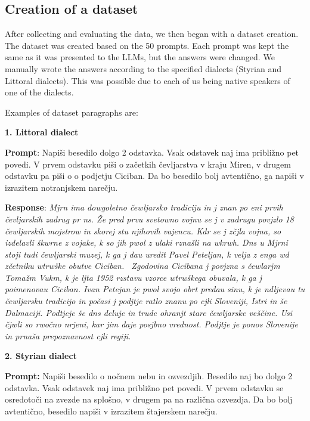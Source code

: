 \documentclass[fleqn,moreauthors,10pt]{ds_report}
\begin{document}
\subsection{Creation of a dataset}

After collecting and evaluating the data, we then began with a dataset creation. The dataset was created based on the 50 prompts. Each prompt was kept the same as it was presented to the LLMs, but the answers were changed. We manually wrote the answers according to the specified dialects (Styrian and Littoral dialects). This was possible due to each of us being native speakers of one of the dialects.

\vspace{\baselineskip}
Examples of dataset paragraphs are:
\vspace{\baselineskip}

\textbf{1. Littoral dialect}

\textbf{Prompt}: Napiši besedilo dolgo 2 odstavka. Vsak odstavek naj ima približno pet povedi. V prvem odstavku piši o začetkih čevljarstva v kraju Miren, v drugem odstavku pa piši o o podjetju Ciciban. Da bo besedilo bolj avtentično, ga napiši v izrazitem notranjskem narečju.

\textbf{Response}:
\textit{Mjrn ima dowgoletno čewljarsko tradiciju in j znan po eni prvih čevljarskih zadrug pr ns. Že pred prvu svetowno vojnu se j v zadrugu povjzlo 18 čewljarskih mojstrow in skorej stu njihovih vajencu. Kdr se j zčjla vojna, so izdelavli škwrne z vojake, k so jih pwol z ulaki rznašli na wkrwh. Dns u Mjrni stoji tudi čewljarski muzej, k ga j dau uredit Pavel Peteljan, k velja z enga wd zčetniku wtrwške obutve Ciciban. 
Zgodovina Cicibana j povjzna s čewlarjm Tomažm Vukm, k je ljta 1952 rzstavu vzorce wtrwškega obuvala, k ga j poimenovau Ciciban. Ivan Petejan je pwol svojo obrt predau sinu, k je ndljevau tu čewljarsku tradicijo in počasi j podjtje ratlo znanu po cjli Sloveniji, Istri in še Dalmaciji. Podtjeje še dns deluje in trude ohranjt stare čewljarske veščine. Usi čjwli so rwočno nrjeni, kar jim daje posjbno vrednost. Podjtje je ponos Slovenije in prnaša prepoznavnost cjli regiji. }

 
\vspace{\baselineskip}
\textbf{2. Styrian dialect}

\textbf{Prompt:} Napiši besedilo o nočnem nebu in ozvezdjih. Besedilo naj bo dolgo 2 odstavka. Vsak odstavek naj ima približno pet povedi. V prvem odstavku se osredotoči na zvezde na splošno, v drugem pa na različna ozvezdja. Da bo bolj avtentično, besedilo napiši v izrazitem štajerskem narečju. 
\end{document}
